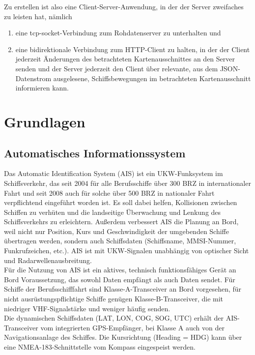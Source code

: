 Zu erstellen ist also eine Client-Server-Anwendung, in der der Server zweifaches zu leisten hat, nämlich 
\begin{enumerate}
 \item eine tcp-socket-Verbindung zum Rohdatenserver zu unterhalten und
  \item eine bidirektionale Verbindung zum HTTP-Client zu halten, in der der Client jederzeit Änderungen des betrachteten Kartenausschnittes an den Server senden und der Server jederzeit den Client über relevante, aus dem JSON-Datenstrom ausgelesene, Schiffsbewegungen im betrachteten Kartenausschnitt informieren kann.
\end{enumerate}


\chapter{Grundlagen}\label{s.Grundlagen}
\section{Automatisches Informationssystem}\label{s.Automatisches Informationssystem (AIS)}
Das Automatic Identification System (AIS) ist ein UKW-Funksystem im Schiffsverkehr, das seit 2004 für alle Berufsschiffe über 300 BRZ in internationaler Fahrt und seit 2008 auch für solche über 500 BRZ in nationaler Fahrt verpflichtend eingeführt worden ist. Es soll dabei helfen, Kollisionen zwischen Schiffen zu verhüten und die landseitige Überwachung und Lenkung des Schiffsverkehrs zu erleichtern. Außerdem verbessert AIS die Planung an Bord, weil nicht nur Position, Kurs und Geschwindigkeit der umgebenden Schiffe übertragen werden, sondern auch Schiffsdaten (Schiffsname, MMSI-Nummer, Funkrufzeichen, etc.). AIS ist mit UKW-Signalen unabhängig von optischer Sicht und Radarwellenausbreitung.\\
Für die Nutzung von AIS ist ein aktives, technisch funktionsfähiges Gerät an Bord Voraussetzung, das sowohl Daten empfängt als auch Daten sendet. Für Schiffe der Berufsschifffahrt sind Klasse-A-Transceiver an Bord vorgesehen, für nicht ausrüstungspflichtige Schiffe genügen Klasse-B-Transceiver, die mit niedriger VHF-Signalstärke und weniger häufig senden.  \\
Die dynamischen Schiffsdaten (LAT, LON, COG, SOG, UTC) erhält der AIS-Transceiver vom integrierten GPS-Empfänger, bei Klasse A auch von der Navigationsanlage des Schiffes. Die Kursrichtung (Heading =  HDG) kann über eine NMEA-183-Schnittstelle vom Kompass eingespeist werden.

